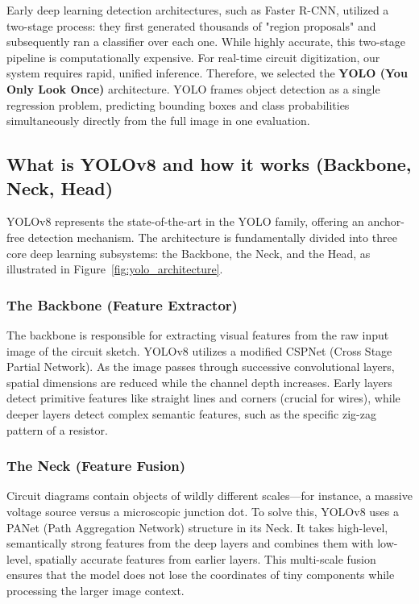 \documentclass[12pt]{article}
\begin{document}
Early deep learning detection architectures, such as Faster R-CNN, utilized a two-stage process: they first generated thousands of "region proposals" and subsequently ran a classifier over each one. While highly accurate, this two-stage pipeline is computationally expensive. For real-time circuit digitization, our system requires rapid, unified inference. Therefore, we selected the \textbf{YOLO (You Only Look Once)} architecture. YOLO frames object detection as a single regression problem, predicting bounding boxes and class probabilities simultaneously directly from the full image in one evaluation.

\subsection{What is YOLOv8 and how it works (Backbone, Neck, Head)}

YOLOv8 represents the state-of-the-art in the YOLO family, offering an anchor-free detection mechanism. The architecture is fundamentally divided into three core deep learning subsystems: the Backbone, the Neck, and the Head, as illustrated in Figure~\ref{fig:yolo_architecture}.

\subsubsection{The Backbone (Feature Extractor)}
The backbone is responsible for extracting visual features from the raw input image of the circuit sketch. YOLOv8 utilizes a modified CSPNet (Cross Stage Partial Network). As the image passes through successive convolutional layers, spatial dimensions are reduced while the channel depth increases. Early layers detect primitive features like straight lines and corners (crucial for wires), while deeper layers detect complex semantic features, such as the specific zig-zag pattern of a resistor.

\subsubsection{The Neck (Feature Fusion)}
Circuit diagrams contain objects of wildly different scales—for instance, a massive voltage source versus a microscopic junction dot. To solve this, YOLOv8 uses a PANet (Path Aggregation Network) structure in its Neck. It takes high-level, semantically strong features from the deep layers and combines them with low-level, spatially accurate features from earlier layers. This multi-scale fusion ensures that the model does not lose the coordinates of tiny components while processing the larger image context.
\end{document}
